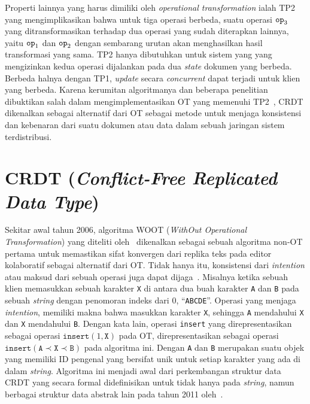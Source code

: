 Properti lainnya yang harus dimiliki oleh \textit{operational transformation} ialah TP2 yang mengimplikasikan bahwa untuk tiga operasi berbeda, suatu operasi $\texttt{op}_3$ yang ditransformasikan terhadap dua operasi yang sudah diterapkan lainnya, yaitu $\texttt{op}_1$ dan $\texttt{op}_2$ dengan sembarang urutan akan menghasilkan hasil transformasi yang sama. TP2 hanya dibutuhkan untuk sistem yang yang mengizinkan kedua operasi dijalankan pada dua \textit{state} dokumen yang berbeda. Berbeda halnya dengan TP1, \textit{update} secara \textit{concurrent} dapat terjadi untuk klien yang berbeda. Karena kerumitan algoritmanya dan beberapa penelitian dibuktikan salah dalam mengimplementasikan OT yang memenuhi TP2~\citep{OTOverview1}, CRDT dikenalkan sebagai alternatif dari OT sebagai metode untuk menjaga konsistensi dan kebenaran dari suatu dokumen atau data dalam sebuah jaringan sistem terdistribusi.

\section{CRDT (\textit{Conflict-Free Replicated Data Type})}

Sekitar awal tahun 2006, algoritma WOOT (\textit{WithOut Operational Transformation}) yang diteliti oleh~\cite{oster2005real} dikenalkan sebagai sebuah algoritma non-OT pertama untuk memastikan sifat konvergen dari replika teks pada editor kolaboratif sebagai alternatif dari OT. Tidak hanya itu, konsistensi dari \textit{intention} atau maksud dari sebuah operasi juga dapat dijaga~\citep{Li2004}. Misalnya ketika sebuah klien memasukkan sebuah karakter \texttt{X} di antara dua buah karakter \texttt{A} dan \texttt{B} pada sebuah \textit{string} dengan penomoran indeks dari $0$, ``\texttt{ABCDE}''. Operasi yang menjaga \textit{intention}, memiliki makna bahwa masukkan karakter \texttt{X}, sehingga \texttt{A} mendahului \texttt{X} dan \texttt{X} mendahului \texttt{B}. Dengan kata lain, operasi \texttt{insert} yang direpresentasikan sebagai operasi $\texttt{insert}(1, \texttt{X})$ pada OT, direpresentasikan sebagai operasi $\texttt{insert}(\texttt{A} \prec \texttt{X} \prec \texttt{B})$ pada algoritma ini. Dengan \texttt{A} dan \texttt{B} merupakan suatu objek yang memiliki ID pengenal yang bersifat unik untuk setiap karakter yang ada di dalam \textit{string}. Algoritma ini menjadi awal dari perkembangan struktur data CRDT yang secara formal didefinisikan untuk tidak hanya pada \textit{string}, namun berbagai struktur data abstrak lain pada tahun 2011 oleh~\cite{Shapiro2011}.

